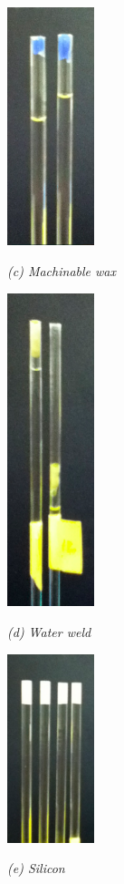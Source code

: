 \begin{figure}[htb]
  \begin{minipage}[t]{1in}
    \centering
    \centerline{\mbox{\includegraphics[width=1in]{phantom/images/tube_sealings/machinable_wax.eps}}}
    \centerline{\emph{(c) Machinable wax}}
  \end{minipage}\medskip
  \begin{minipage}[t]{1in}
    \centering
    \centerline{\mbox{\includegraphics[width=1in]{phantom/images/tube_sealings/water_weld.eps}}}
    \centerline{\emph{(d) Water weld}}
  \end{minipage}

  \begin{minipage}[t]{1in}
    \centering
    \centerline{\mbox{\includegraphics[width=1in]{phantom/images/tube_sealings/silicon.eps}}}
    \centerline{\emph{(e) Silicon}}
  \end{minipage}

\end{figure}

